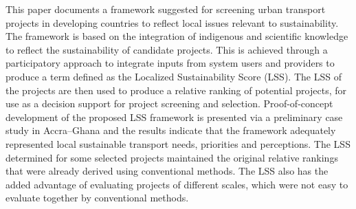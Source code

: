 This paper documents a framework suggested for screening urban transport projects in developing countries to reflect local issues relevant to sustainability. The framework is based on the integration of indigenous and scientific knowledge to reflect the sustainability of candidate projects. This is achieved through a participatory approach to integrate inputs from system users and providers to produce a term defined as the Localized Sustainability Score (LSS). The LSS of the projects are then used to produce a relative ranking of potential projects, for use as a decision support for project screening and selection. Proof-of-concept development of the proposed LSS framework is presented via a preliminary case study in Accra–Ghana and the results indicate that the framework adequately represented local sustainable transport needs, priorities and perceptions. The LSS determined for some selected projects maintained the original relative rankings that were already derived using conventional methods. The LSS also has the added advantage of evaluating projects of different scales, which were not easy to evaluate together by conventional methods.